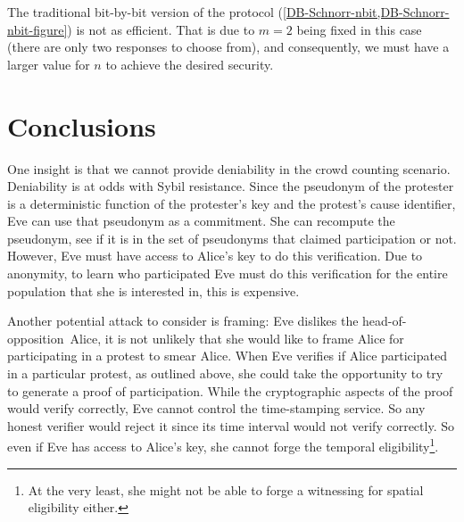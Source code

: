 The traditional bit-by-bit version of the protocol 
(\cref{DB-Schnorr-nbit,DB-Schnorr-nbit-figure}) is not as efficient.
That is due to \(m = 2\) being fixed in this case (there are only two responses 
to choose from), and consequently, we must have a larger value for \(n\) to 
achieve the desired security.


\section{Conclusions}


One insight is that we cannot provide deniability in the crowd counting 
scenario.
Deniability is at odds with Sybil resistance.
Since the pseudonym of the protester is a deterministic function of the 
protester's key and the protest's cause identifier, Eve can use that pseudonym 
as a commitment.
She can recompute the pseudonym, see if it is in the set of pseudonyms that 
claimed participation or not.
However, Eve must have access to Alice's key to do this verification.
Due to anonymity, to learn who participated Eve must do this verification for 
the entire population that she is interested in, this is expensive.

Another potential attack to consider is framing:
Eve dislikes the head-of-opposition~Alice, it is not unlikely that she would 
like to frame Alice for participating in a protest to smear Alice.
When Eve verifies if Alice participated in a particular protest, as outlined 
above, she could take the opportunity to try to generate a proof of 
participation.
While the cryptographic aspects of the proof would verify correctly, Eve cannot 
control the time-stamping service.
So any honest verifier would reject it since its time interval would not verify 
correctly.
So even if Eve has access to Alice's key, she cannot forge the temporal 
eligibility\footnote{%
  At the very least, she might not be able to forge a witnessing for spatial 
  eligibility either.
}.

